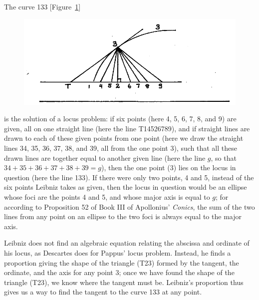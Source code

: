 \documentclass[twoside,openright]{article}
\begin{document}
The curve 133 [Figure~\ref{locus2}] 
\begin{figure}[htp]
\begin{center}
\includegraphics[width=\textwidth]{fig/Figure24}
\caption{}
\label{locus2}
\vspace{-10pt}
\end{center}
\end{figure}is the solution of a locus problem: if six points (here 4,
5, 6, 7, 8, and 9) are given, all on one straight line (here the line
T14526789), and if straight lines are drawn to each of these given
points from one point (here we draw the straight lines 34, 35, 36, 37,
38, and 39, all from the one point 3), such that all these drawn lines
are together equal to another given line (here the line $g$, so that
$34 + 35 + 36 + 37 + 38 + 39 = g$), then the one point (3) lies on the
locus in question (here the line 133).  If there were only two points,
4 and 5, instead of the six points Leibniz takes as given, then the
locus in question would be an ellipse whose foci are the points 4 and
5, and whose major axis is equal to $g$; for according to Proposition
52 of Book III of Apollonius' {\em Conics}, the sum of the two lines
from any point on an ellipse to the two foci is always equal to the
major axis.

Leibniz does not find an algebraic equation relating the abscissa and
ordinate of his locus, as Descartes does for Pappus' locus problem.
Instead, he finds a proportion giving the shape of the triangle (T23)
formed by the tangent, the ordinate, and the axis for any point 3;
once we have found the shape of the triangle (T23), we know where the
tangent must be.  Leibniz's proportion thus gives us a way to find the
tangent to the curve 133 at any point.
\end{document}
